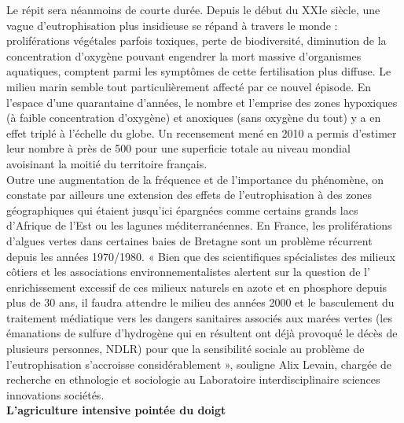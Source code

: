 \documentclass[8pt]{article}
\begin{document}
Le répit sera néanmoins de courte durée. Depuis le début du XXIe siècle, une vague d’eutrophisation plus insidieuse se répand à travers le monde : proliférations végétales parfois toxiques, perte de biodiversité, diminution de la concentration d’oxygène pouvant engendrer la mort massive d’organismes aquatiques, comptent parmi les symptômes de cette fertilisation plus diffuse. Le milieu marin semble tout particulièrement affecté par ce nouvel épisode. En l’espace d’une quarantaine d’années, le nombre et l’emprise des zones hypoxiques (à faible concentration d’oxygène) et anoxiques (sans oxygène du tout) y a en effet triplé à l’échelle du globe. Un recensement mené en 2010 a permis d’estimer leur nombre à près de 500 pour une superficie totale au niveau mondial avoisinant la moitié du territoire français.\\

Outre une augmentation de la fréquence et de l’importance du phénomène, on constate par ailleurs une extension des effets de l'eutrophisation à des zones géographiques qui étaient jusqu'ici épargnées comme certains grands lacs d'Afrique de l'Est ou les lagunes méditerranéennes. En France, les proliférations d'algues vertes dans certaines baies de Bretagne sont un problème récurrent depuis les années 1970/1980. « Bien que des scientifiques spécialistes des milieux côtiers et les associations environnementalistes alertent sur la question de l' enrichissement excessif de ces milieux naturels en azote et en phosphore depuis plus de 30 ans, il faudra attendre le milieu des années 2000 et le basculement du traitement médiatique vers les dangers sanitaires associés aux marées vertes (les émanations de sulfure d'hydrogène qui en résultent ont déjà provoqué le décès de plusieurs personnes, NDLR) pour que la sensibilité sociale au problème de l'eutrophisation s’accroisse considérablement », souligne Alix Levain, chargée de recherche en ethnologie et sociologie au Laboratoire interdisciplinaire sciences innovations sociétés.\\

\textbf{L’agriculture intensive pointée du doigt}\\
\end{document}
